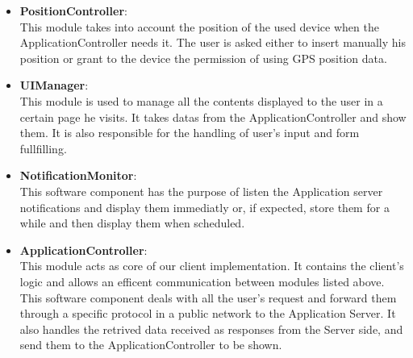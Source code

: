 \documentclass[numbers=noenddot, 12pt, a4paper, oneside]{scrbook}
\begin{document}
\begin{itemize}	
	
	\item \textbf{PositionController}:\\\newline
	This module takes into account the position of the used device when the ApplicationController needs it. The user is asked either to insert manually his position or grant to the device the permission of using GPS position data.\\
	
	\item \textbf{UIManager}:\\\newline
	This module is used to manage all the contents displayed to the user in a certain page he visits. It takes datas from the ApplicationController and show them. It is also responsible for the handling of user's input and form fullfilling.\\
	
	\item \textbf{NotificationMonitor}:\\\newline
	This software component has the purpose of listen the Application server notifications and display them immediatly or, if expected, store them for a while and then display them when scheduled.\\
	
	\item \textbf{ApplicationController}:\\\newline
	This module acts as core of our client implementation. It contains the client's logic and allows an efficent communication between modules listed above.\\
	
	This software component deals with all the user's request and forward them through a specific protocol in a public network to the Application Server.
	It also handles the retrived data received as responses from the Server side, and send them to the ApplicationController to be shown.\\
	
\end{itemize}
\end{document}
